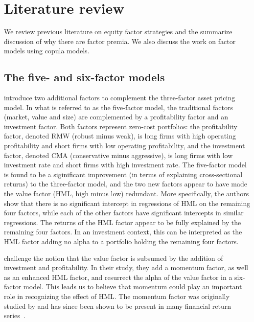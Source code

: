 \section{Literature review}
\label{sec:literature}

We review previous literature on equity factor strategies and the summarize discussion of why there are factor premia. We also discuss the work on factor models using copula models.

\subsection{The five- and six-factor models}

\textcite{FF2015} introduce two additional factors to complement the \textcite{FamaFrench1993} three-factor asset pricing model. In what is referred to as the five-factor model, the traditional factors (market, value and size) are complemented by a profitability factor and an investment factor. Both factors represent zero-cost portfolios: the profitability factor, denoted RMW (robust minus weak), is long firms with high operating profitability and short firms with low operating profitability, and the investment factor, denoted CMA (conservative minus aggressive), is long firms with low investment rate and short firms with high investment rate. The five-factor model is found to be a siginificant improvement (in terms of explaining cross-sectional returns) to the three-factor model, and the two new factors appear to have made the value factor (HML, high minus low) redundant. More specifically, the authors show that there is no significant intercept in regressions of HML on the remaining four factors, while each of the other factors have significant intercepts in similar regressions. The returns of the HML factor appear to be fully explained by the remaining four factors. In an investment context, this can be interpreted as the HML factor adding no alpha to a portfolio holding the remaining four factors.

\textcite{Asness2015} challenge the notion that the value factor is subsumed by the addition of investment and profitability. In their study, they add a momentum factor, as well as an enhanced HML factor, and resurrect the alpha of the value factor in a six-factor model. This leads us to believe that momentum could play an important role in recognizing the effect of HML. The momentum factor was originally studied by \textcite{JegadeeshTitman1993} and has since been shown to be present in many financial return series~\autocite{AsnessMoskovitzPedersen2013}.

